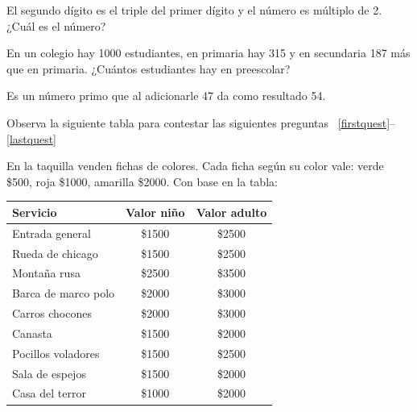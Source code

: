 \documentclass[10pt,letterpaper,addpoints]{exam}
\begin{document}
\begin{questions}
\question
El segundo dígito es el triple del primer dígito y el número es múltiplo de 2. ¿Cuál es el número?

\begin{oneparchoices}
\end{oneparchoices}
\question 
En un colegio hay 1000 estudiantes, en primaria hay 315 y en secundaria 187 más que en primaria. ¿Cuántos estudiantes hay en preescolar?

\begin{oneparchoices}
\end{oneparchoices}
\question
Es un n\'umero primo que al adicionarle 47 da como resultado 54.

\begin{oneparchoices}
\end{oneparchoices}

\begin{minipage}{.4\textwidth}{Observa la siguiente tabla para contestar las siguientes preguntas ~\ref{firstquest}--\ref{lastquest}

En la taquilla venden fichas de colores. Cada ficha según su color vale: verde \$500, roja \$1000, amarilla \$2000. Con base en la tabla:}
\end{minipage}\hfill
\begin{minipage}{.5\textwidth}{
\begin{tabular}{|l|c|c|}
\hline 
Servicio & Valor niño & Valor adulto \\ 
\hline 
Entrada general & \$1500 & \$2500 \\ 
\hline 
Rueda de chicago & \$1500 & \$2500 \\ 
\hline 
Montaña rusa & \$2500 & \$3500 \\ 
\hline 
Barca de marco polo & \$2000 & \$3000 \\ 
\hline 
Carros chocones & \$2000 & \$3000 \\ 
\hline 
Canasta & \$1500 & \$2000 \\ 
\hline 
Pocillos voladores & \$1500 & \$2500 \\ 
\hline 
Sala de espejos & \$1500 & \$2000 \\ 
\hline 
Casa del terror & \$1000 & \$2000 \\ 
\hline 
\end{tabular}}
\end{minipage}



\end{questions}
\end{document}
